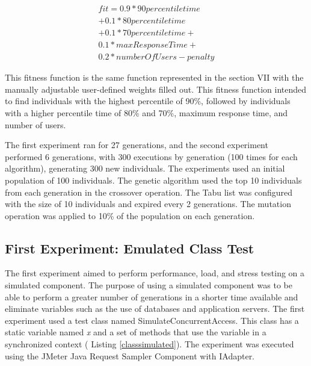 \documentclass[espaco=umemeio,chapter=TITLE,twoside,openright]{abnt}
\begin{document}
\begin{equation}
\begin{aligned}
fit=0.9* 90percentiletime\\
+0.1*80percentiletime\\+
0.1*70percentiletime+\\
0.1*maxResponseTime+\\
0.2*numberOfUsers-penalty
\end{aligned}
\end{equation}

This fitness function is the same function represented in the section VII with the manually adjustable user-defined weights filled out. This fitness function intended to find individuals with the highest percentile of 90\%, followed by individuals with a higher percentile time of 80\% and 70\%, maximum response time, and number of users.

The first experiment ran for 27 generations, and the second experiment  performed 6 generations, with 300 executions by generation (100 times for each algorithm),  generating 300 new individuals. The experiments used an initial population of 100 individuals. The genetic algorithm used the top 10 individuals from each generation in the crossover operation. The Tabu list was configured with the size of 10 individuals and expired every 2 generations.  The mutation operation was applied to 10\% of the population on each generation.

\subsection{First Experiment: Emulated Class Test}

The first experiment aimed to perform performance, load, and stress testing on a simulated component. The purpose of using a simulated component was to be able to perform a greater number of generations in a shorter time available and eliminate variables such as the use of databases and application servers. The first experiment used a test class  named SimulateConcurrentAccess. This class has a static variable named \textit{x} and a set of methods that use the variable in a synchronized context ( Listing \ref{classsimulated}). The experiment was executed using the JMeter Java Request Sampler Component with IAdapter.

\end{document}
